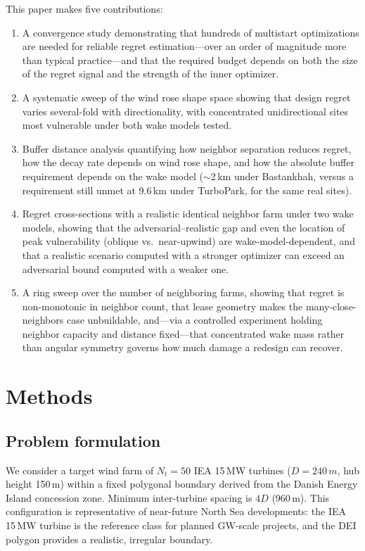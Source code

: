 \documentclass[wes, manuscript]{copernicus}
\begin{document}
This paper makes five contributions:
\begin{enumerate}
    \item A convergence study demonstrating that hundreds of multistart optimizations are needed for reliable regret estimation---over an order of magnitude more than typical practice---and that the required budget depends on both the size of the regret signal and the strength of the inner optimizer.
    \item A systematic sweep of the wind rose shape space showing that design regret varies several-fold with directionality, with concentrated unidirectional sites most vulnerable under both wake models tested.
    \item Buffer distance analysis quantifying how neighbor separation reduces regret, how the decay rate depends on wind rose shape, and how the absolute buffer requirement depends on the wake model ($\sim$2\,km under Bastankhah, versus a requirement still unmet at 9.6\,km under TurboPark, for the same real sites).
    \item Regret cross-sections with a realistic identical neighbor farm under two wake models, showing that the adversarial--realistic gap and even the location of peak vulnerability (oblique vs.\ near-upwind) are wake-model-dependent, and that a realistic scenario computed with a stronger optimizer can exceed an adversarial bound computed with a weaker one.
    \item A ring sweep over the number of neighboring farms, showing that regret is non-monotonic in neighbor count, that lease geometry makes the many-close-neighbors case unbuildable, and---via a controlled experiment holding neighbor capacity and distance fixed---that concentrated wake mass rather than angular symmetry governs how much damage a redesign can recover.
\end{enumerate}


\section{Methods}\label{sec:methods}

\subsection{Problem formulation}

We consider a target wind farm of $N_t = 50$ IEA 15\,MW turbines ($D = 240\,m$, hub height 150\,m) within a fixed polygonal boundary derived from the Danish Energy Island concession zone.
Minimum inter-turbine spacing is $4D$ (960\,m).
This configuration is representative of near-future North Sea developments: the IEA 15\,MW turbine is the reference class for planned GW-scale projects, and the DEI polygon provides a realistic, irregular boundary.
\end{document}

